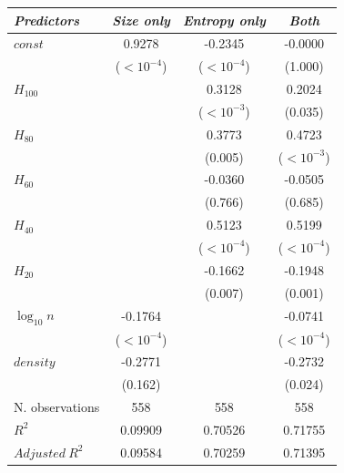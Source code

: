 \begin{tabular}{lccc}
\toprule
\textit{Predictors} & \textit{Size only} & \textit{Entropy only} & \textit{Both} \\
\midrule
$\mathit{const}$ & 0.9278 & -0.2345 & -0.0000 \\
 & {\scriptsize ($<10^{-4}$)} & {\scriptsize ($<10^{-4}$)} & {\scriptsize (1.000)} \\
$H_{100}$ &  & 0.3128 & 0.2024 \\
 &  & {\scriptsize ($<10^{-3}$)} & {\scriptsize (0.035)} \\
$H_{80}$ &  & 0.3773 & 0.4723 \\
 &  & {\scriptsize (0.005)} & {\scriptsize ($<10^{-3}$)} \\
$H_{60}$ &  & -0.0360 & -0.0505 \\
 &  & {\scriptsize (0.766)} & {\scriptsize (0.685)} \\
$H_{40}$ &  & 0.5123 & 0.5199 \\
 &  & {\scriptsize ($<10^{-4}$)} & {\scriptsize ($<10^{-4}$)} \\
$H_{20}$ &  & -0.1662 & -0.1948 \\
 &  & {\scriptsize (0.007)} & {\scriptsize (0.001)} \\
$\log_{10} n$ & -0.1764 &  & -0.0741 \\
 & {\scriptsize ($<10^{-4}$)} &  & {\scriptsize ($<10^{-4}$)} \\
$\mathit{density}$ & -0.2771 &  & -0.2732 \\
 & {\scriptsize (0.162)} &  & {\scriptsize (0.024)} \\
\midrule
N. observations & 558 & 558 & 558 \\
$R^2$ & 0.09909 & 0.70526 & 0.71755 \\
$\mathit{Adjusted}~R^2$ & 0.09584 & 0.70259 & 0.71395 \\
\bottomrule
\end{tabular}
